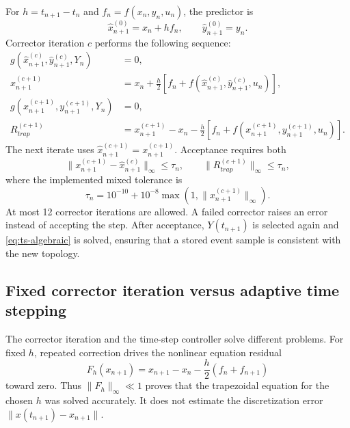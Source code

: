 \documentclass[12pt,a4paper]{article}
\begin{document}
For $h=t_{n+1}-t_n$ and $f_n=f(x_n,y_n,u_n)$, the predictor is
\begin{equation}
\hat x^{(0)}_{n+1}=x_n+h f_n,\qquad
\hat y^{(0)}_{n+1}=y_n.
\label{eq:ts-predictor}
\end{equation}
Corrector iteration $c$ performs the following sequence:
\begin{align}
g(\hat x^{(c)}_{n+1},\hat y^{(c)}_{n+1},Y_n)&=0,\\
x^{(c+1)}_{n+1}
 &=x_n+\frac{h}{2}\left[f_n+
 f(\hat x^{(c)}_{n+1},\hat y^{(c)}_{n+1},u_n)\right],\\
g(x^{(c+1)}_{n+1},y^{(c+1)}_{n+1},Y_n)&=0,\\
R^{(c+1)}_{trap}
 &=x^{(c+1)}_{n+1}-x_n-\frac{h}{2}\left[f_n+
 f(x^{(c+1)}_{n+1},y^{(c+1)}_{n+1},u_n)\right].
\label{eq:ts-corrector}
\end{align}
The next iterate uses
$\hat x^{(c+1)}_{n+1}=x^{(c+1)}_{n+1}$. Acceptance requires both
\begin{equation}
\|x^{(c+1)}_{n+1}-\hat x^{(c)}_{n+1}\|_\infty\le\tau_n,
\qquad
\|R^{(c+1)}_{trap}\|_\infty\le\tau_n,
\end{equation}
where the implemented mixed tolerance is
\begin{equation}
\tau_n=10^{-10}+10^{-8}\max\left(1,\|x^{(c+1)}_{n+1}\|_\infty\right).
\end{equation}
At most 12 corrector iterations are allowed. A failed corrector raises an error
instead of accepting the step. After acceptance, $Y(t_{n+1})$ is selected
again and \eqref{eq:ts-algebraic} is solved, ensuring that a stored event
sample is consistent with the new topology.

\subsection{Fixed corrector iteration versus adaptive time stepping}

The corrector iteration and the time-step controller solve different problems.
For fixed $h$, repeated correction drives the nonlinear equation residual
\begin{equation}
F_h(x_{n+1})=
x_{n+1}-x_n-\frac{h}{2}\left(f_n+f_{n+1}\right)
\end{equation}
toward zero. Thus $\|F_h\|_\infty\ll1$ proves that the trapezoidal equation
for the chosen $h$ was solved accurately. It does not estimate the discretization
error $\|x(t_{n+1})-x_{n+1}\|$.
\end{document}
